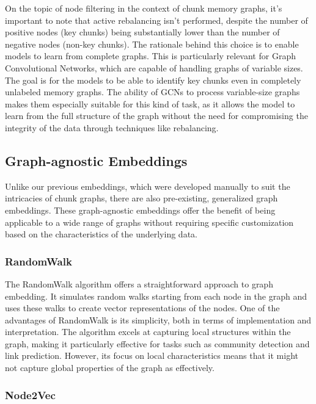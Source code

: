 On the topic of node filtering in the context of chunk memory graphs, it's important to note that active rebalancing isn't performed, despite the number of positive nodes (key chunks) being substantially lower than the number of negative nodes (non-key chunks). The rationale behind this choice is to enable models to learn from complete graphs. This is particularly relevant for Graph Convolutional Networks, which are capable of handling graphs of variable sizes. The goal is for the models to be able to identify key chunks even in completely unlabeled memory graphs. The ability of GCNs to process variable-size graphs makes them especially suitable for this kind of task, as it allows the model to learn from the full structure of the graph without the need for compromising the integrity of the data through techniques like rebalancing.

\subsection{Graph-agnostic Embeddings}

Unlike our previous embeddings, which were developed manually to suit the intricacies of chunk graphs, there are also pre-existing, generalized graph embeddings. These graph-agnostic embeddings offer the benefit of being applicable to a wide range of graphs without requiring specific customization based on the characteristics of the underlying data.

\subsubsection{RandomWalk}

The RandomWalk algorithm offers a straightforward approach to graph embedding. It simulates random walks starting from each node in the graph and uses these walks to create vector representations of the nodes. One of the advantages of RandomWalk is its simplicity, both in terms of implementation and interpretation. The algorithm excels at capturing local structures within the graph, making it particularly effective for tasks such as community detection and link prediction. However, its focus on local characteristics means that it might not capture global properties of the graph as effectively.

\subsubsection{Node2Vec}

